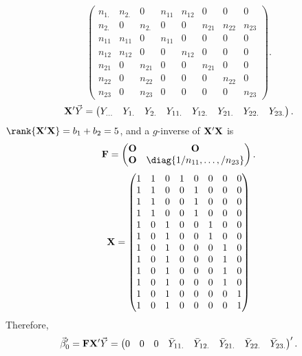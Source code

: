 \begin{Example}{}{}
\[\begin{pmatrix}
            n_{1.} & n_{2.} & 0      & n_{11} & n_{12} & 0      & 0      & 0      \\
            n_{2.} & 0      & n_{2.} & 0      & 0      & n_{21} & n_{22} & n_{23} \\
            n_{11} & n_{11} & 0      & n_{11} & 0      & 0      & 0      & 0      \\
            n_{12} & n_{12} & 0      & 0      & n_{12} & 0      & 0      & 0      \\
            n_{21} & 0      & n_{21} & 0      & 0      & n_{21} & 0      & 0      \\
            n_{22} & 0      & n_{22} & 0      & 0      & 0      & n_{22} & 0      \\
            n_{23} & 0      & n_{23} & 0      & 0      & 0      & 0      & n_{23}
        \end{pmatrix}. \]
    \[ \mathbf{X}'\vec{Y}=\begin{pmatrix}
            Y_{...} & Y_{1.} & Y_{2.} & Y_{11.} & Y_{12.} & Y_{21.} & Y_{22.} & Y_{23.}
        \end{pmatrix}. \]
    $ \rank{\Matrix{X}'\Matrix{X}}=b_1+b_2=5 $, and a $ g $-inverse of $ \mathbf{X}'\mathbf{X} $ is
    \[ \Matrix{F}=\begin{pmatrix}
            \Matrix{O} & \Matrix{O}                     \\
            \Matrix{O} & \diag{1/n_{11},\ldots,/n_{23}}
        \end{pmatrix}. \]
    \[ \mathbf{X}=\begin{pmatrix}
            1 & 1 & 0 & 1 & 0 & 0 & 0 & 0 \\
            1 & 1 & 0 & 0 & 1 & 0 & 0 & 0 \\
            1 & 1 & 0 & 0 & 1 & 0 & 0 & 0 \\
            1 & 1 & 0 & 0 & 1 & 0 & 0 & 0 \\
            1 & 0 & 1 & 0 & 0 & 1 & 0 & 0 \\
            1 & 0 & 1 & 0 & 0 & 1 & 0 & 0 \\
            1 & 0 & 1 & 0 & 0 & 0 & 1 & 0 \\
            1 & 0 & 1 & 0 & 0 & 0 & 1 & 0 \\
            1 & 0 & 1 & 0 & 0 & 0 & 1 & 0 \\
            1 & 0 & 1 & 0 & 0 & 0 & 1 & 0 \\
            1 & 0 & 1 & 0 & 0 & 0 & 0 & 1 \\
            1 & 0 & 1 & 0 & 0 & 0 & 0 & 1 \\
        \end{pmatrix} \]
    Therefore,
    \[ \vec{\beta}_0'=\mathbf{F}\mathbf{X}'\vec{Y}=\begin{pmatrix}
            0 & 0 & 0 & \bar{Y}_{11.} & \bar{Y}_{12.} & \bar{Y}_{21.} & \bar{Y}_{22.} & \bar{Y}_{23.}
        \end{pmatrix}'. \]
\end{Example}
